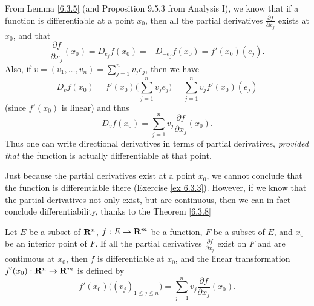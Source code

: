 \begin{additional corollary}\label{ac 6.3.2}
From Lemma \ref{6.3.5} (and Proposition 9.5.3 from Analysis I), we know that if a function is differentiable at a point \(x_0\), then all the partial derivatives \(\frac{\partial f}{\partial x_j}\) exists at \(x_0\), and that
\[
    \frac{\partial f}{\partial x_j}(x_0) = D_{e_j} f(x_0) = - D_{-e_j} f(x_0) = f'(x_0)(e_j).
\]
Also, if \(v = (v_1, \dots, v_n) = \sum_{j = 1}^n v_j e_j\), then we have
\[
    D_v f(x_0) = f'(x_0) \bigg(\sum_{j = 1}^n v_j e_j\bigg) = \sum_{j = 1}^n v_j f'(x_0)(e_j)
\]
(since \(f'(x_0)\) is linear) and thus
\[
    D_v f(x_0) = \sum_{j = 1}^n v_j \frac{\partial f}{\partial x_j}(x_0).
\]
Thus one can write directional derivatives in terms of partial derivatives, \emph{provided that} the function is actually differentiable at that point.
\end{additional corollary}

\begin{note}
    Just because the partial derivatives exist at a point \(x_0\), we cannot conclude that the function is differentiable there (Exercise \ref{ex 6.3.3}).
    However, if we know that the partial derivatives not only exist, but are continuous, then we can in fact conclude differentiability, thanks to the Theorem \ref{6.3.8}
\end{note}

\begin{theorem}\label{6.3.8}
    Let \(E\) be a subset of \(\mathbf{R}^n\), \(f : E \to \mathbf{R}^m\) be a function, \(F\) be a subset of \(E\), and \(x_0\) be an interior point of \(F\).
    If all the partial derivatives \(\frac{\partial f}{\partial x_j}\) exist on \(F\) and are continuous at \(x_0\), then \(f\) is differentiable at \(x_0\), and the linear transformation \(f'(x_0) : \mathbf{R}^n \to \mathbf{R}^m\) is defined by
    \[
        f'(x_0)\big((v_j)_{1 \leq j \leq n}\big) = \sum_{j = 1}^n v_j \frac{\partial f}{\partial x_j}(x_0).
    \]
\end{theorem}

